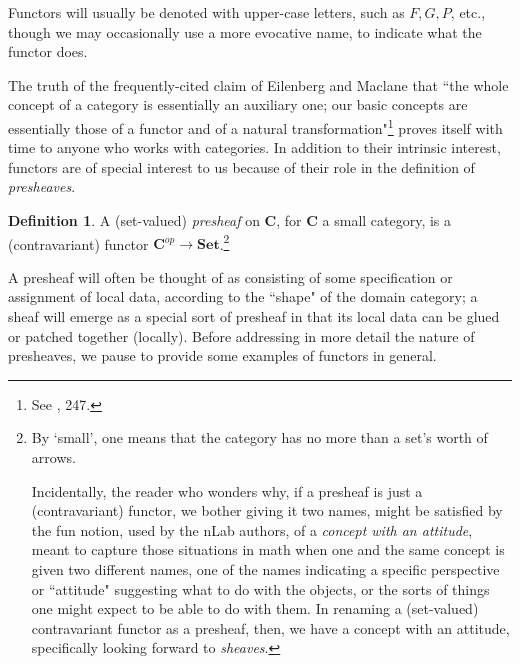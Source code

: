 \documentclass[a4paper]{book}
\theoremstyle{definition}
\theoremstyle{definition}
\newtheorem{definition}{Definition}[section]
\theoremstyle{definition}
\theoremstyle{theorem}
\theoremstyle{definition}
\begin{document}
Functors will usually be denoted with upper-case letters, such as $F, G, P$, etc., though we may occasionally use a more evocative name, to indicate what the functor does. \par 
The truth of the frequently-cited claim of Eilenberg and Maclane that ``the whole concept of a category is essentially an auxiliary one; our basic concepts are essentially those of a functor and of a natural transformation"\footnote{See \cite{maclane_general_1945}, 247.} proves itself with time to anyone who works with categories. In addition to their intrinsic interest, functors are of special interest to us because of their role in the definition of \textit{presheaves}.   
\begin{definition}
	A (set-valued) \textit{presheaf}  on \textbf{C}, for \textbf{C} a small category, is a (contravariant) functor $\textbf{C}^{op} \rightarrow \textbf{Set}$.\footnote{By `small', one means that the category has no more than a set's worth of arrows. \par 
	Incidentally, the reader who wonders why, if a presheaf is just a (contravariant) functor, we bother giving it two names, might be satisfied by the fun notion, used by the nLab authors, of a \textit{concept with an attitude}, meant to capture those situations in math when one and the same concept is given two different names, one of the names indicating a specific perspective or ``attitude" suggesting what to do with the objects, or the sorts of things one might expect to be able to do with them. In renaming a (set-valued) contravariant functor as a presheaf, then, we have a concept with an attitude, specifically looking forward to \textit{sheaves}.}   
\end{definition} \noindent 
A presheaf will often be thought of as consisting of some specification or assignment of local data, according to the ``shape" of the domain category; a sheaf will emerge as a special sort of presheaf in that its local data can be glued or patched together (locally). Before addressing in more detail the nature of presheaves, we pause to provide some examples of functors in general.
\end{document}
